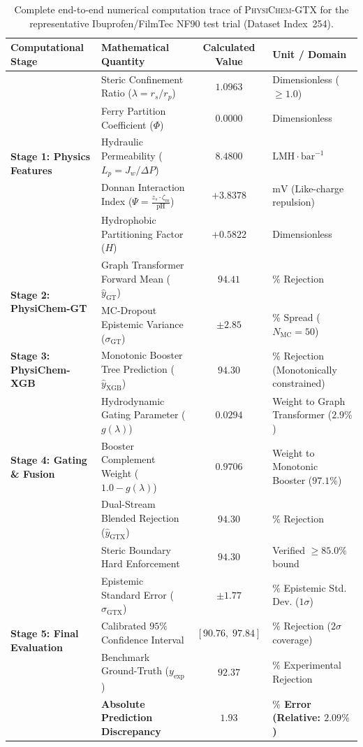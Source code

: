 \documentclass[11pt]{article}
\begin{document}
\begin{table}[H]
\centering
\small
\caption{Complete end-to-end numerical computation trace of \textsc{PhysiChem-GTX} for the representative Ibuprofen/FilmTec NF90 test trial (Dataset Index~254).}
\label{tab:s8_trace_summary}
\begin{tabular}{llcl}
\toprule
\textbf{Computational Stage} & \textbf{Mathematical Quantity} & \textbf{Calculated Value} & \textbf{Unit / Domain} \\
\midrule
\multirow{5}{*}{\textbf{Stage 1: Physics Features}}
& Steric Confinement Ratio ($\lambda = r_s / r_p$) & $1.0963$ & Dimensionless ($\ge 1.0$) \\
& Ferry Partition Coefficient ($\Phi$) & $0.0000$ & Dimensionless \\
& Hydraulic Permeability ($L_p = J_w / \Delta P$) & $8.4800$ & $\mathrm{LMH}\cdot\mathrm{bar}^{-1}$ \\
& Donnan Interaction Index ($\Psi = \frac{z_s \cdot \zeta_m}{\mathrm{pH}}$) & $+3.8378$ & $\mathrm{mV}$ (Like-charge repulsion) \\
& Hydrophobic Partitioning Factor ($H$) & $+0.5822$ & Dimensionless \\
\midrule
\multirow{2}{*}{\textbf{Stage 2: PhysiChem-GT}}
& Graph Transformer Forward Mean ($\hat{y}_{\mathrm{GT}}$) & $94.41$ & $\%$ Rejection \\
& MC-Dropout Epistemic Variance ($\sigma_{\mathrm{GT}}$) & $\pm 2.85$ & $\%$ Spread ($N_{\mathrm{MC}} = 50$) \\
\midrule
\textbf{Stage 3: PhysiChem-XGB}
& Monotonic Booster Tree Prediction ($\hat{y}_{\mathrm{XGB}}$) & $94.30$ & $\%$ Rejection (Monotonically constrained) \\
\midrule
\multirow{3}{*}{\textbf{Stage 4: Gating \& Fusion}}
& Hydrodynamic Gating Parameter ($g(\lambda)$) & $0.0294$ & Weight to Graph Transformer ($2.9\%$) \\
& Booster Complement Weight ($1.0 - g(\lambda)$) & $0.9706$ & Weight to Monotonic Booster ($97.1\%$) \\
& Dual-Stream Blended Rejection ($\hat{y}_{\mathrm{GTX}}$) & $94.30$ & $\%$ Rejection \\
\midrule
\multirow{5}{*}{\textbf{Stage 5: Final Evaluation}}
& Steric Boundary Hard Enforcement & $94.30$ & Verified $\ge 85.0\%$ bound \\
& Epistemic Standard Error ($\sigma_{\mathrm{GTX}}$) & $\pm 1.77$ & $\%$ Epistemic Std. Dev. ($1\sigma$) \\
& Calibrated $95\%$ Confidence Interval & $[90.76, \; 97.84]$ & $\%$ Rejection ($2\sigma$ coverage) \\
& Benchmark Ground-Truth ($y_{\mathrm{exp}}$) & $92.37$ & $\%$ Experimental Rejection \\
& \textbf{Absolute Prediction Discrepancy} & $\mathbf{1.93}$ & \textbf{$\%$ Error (Relative: $2.09\%$)} \\
\bottomrule
\end{tabular}
\end{table}
\end{document}
